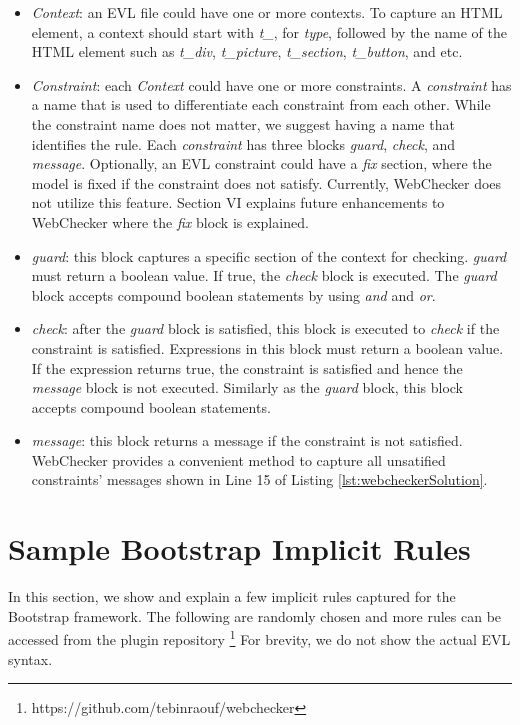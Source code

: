 \documentclass[conference]{IEEETran}
\begin{document}
\begin{itemize}
\item \textit{Context}: an EVL file could have one or more contexts. To capture an HTML element, a context should start with \textit{t\_}, for \textit{type}, followed by the name of the HTML element such as \textit{t\_div}, \textit{t\_picture}, \textit{t\_section}, \textit{t\_button}, and etc.
\item \textit{Constraint}: each \textit{Context} could have one or more constraints. A \textit{constraint} has a name that is used to differentiate each constraint from each other. While the constraint name does not matter, we suggest having a name that identifies the rule. Each \textit{constraint} has three blocks \textit{guard}, \textit{check}, and \textit{message}. Optionally, an EVL constraint could have a \textit{fix} section, where the model is fixed if the constraint does not satisfy. Currently, WebChecker does not utilize this feature. Section VI explains future enhancements to WebChecker where the \textit{fix} block is explained. 
\item \textit{guard}: this block captures a specific section of the context for checking. \textit{guard} must return a boolean value. If true, the \textit{check} block is executed. The \textit{guard} block accepts compound boolean statements by using \textit{and} and \textit{or}.      
\end{itemize}
\begin{itemize}
\item \textit{check}: after the \textit{guard} block is satisfied, this block is executed to \textit{check} if the constraint is satisfied. Expressions in this block must return a boolean value. If the expression returns true, the constraint is satisfied and hence the \textit{message} block is not executed. Similarly as the \textit{guard} block, this block accepts compound boolean statements.
\item \textit{message}: this block returns a message if the constraint is not satisfied. WebChecker provides a convenient method to capture all unsatified constraints' messages shown in Line 15 of Listing \ref{lst:webcheckerSolution}.  
\end{itemize}

\section{Sample Bootstrap Implicit Rules}
In this section, we show and explain a few implicit rules captured for the Bootstrap framework. The following are randomly chosen and more rules can be accessed from the plugin repository \footnote{https://github.com/tebinraouf/webchecker} For brevity, we do not show the actual EVL syntax.
  
\end{document}
